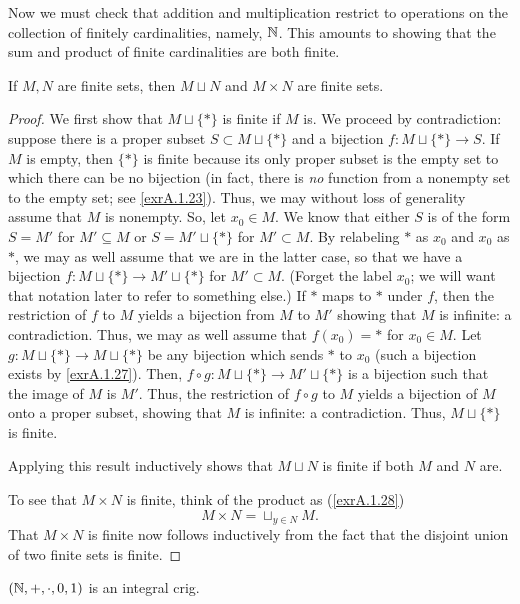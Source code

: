 Now we must check that addition and multiplication restrict to operations on the collection of finitely cardinalities, namely, $\mathbb{N}$.  This amounts to showing that the sum and product of finite cardinalities are both finite.
\begin{prp}
If $M,N$ are finite sets, then $M\sqcup N$ and $M\times N$ are finite sets.
\begin{proof}
We first show that $M\sqcup \{ \ast \}$ is finite if $M$ is.  We proceed by contradiction:  suppose there is a proper subset $S\subset M\sqcup \{ \ast \}$ and a bijection $f:M\sqcup \{ \ast \} \rightarrow S$.  If $M$ is empty, then $\{ \ast \}$ is finite because its only proper subset is the empty set to which there can be no bijection (in fact, there is \emph{no} function from a nonempty set to the empty set; see \cref{exrA.1.23}).  Thus, we may without loss of generality assume that $M$ is nonempty.  So, let $x_0\in M$.  We know that either $S$ is of the form $S=M'$ for $M'\subseteq M$ or $S=M'\sqcup \{ \ast \}$ for $M'\subset M$.  By relabeling $\ast$ as $x_0$ and $x_0$ as $\ast$, we may as well assume that we are in the latter case, so that we have a bijection $f:M\sqcup \{ \ast \} \rightarrow M'\sqcup \{ \ast \}$ for $M'\subset M$.  (Forget the label $x_0$; we will want that notation later to refer to something else.)  If $\ast$ maps to $\ast$ under $f$, then the restriction of $f$ to $M$ yields a bijection from $M$ to $M'$ showing that $M$ is infinite:  a contradiction.  Thus, we may as well assume that $f(x_0 )=\ast$ for $x_0\in M$.  Let $g:M\sqcup \{ \ast \} \rightarrow M\sqcup \{ \ast \}$ be any bijection which sends $\ast$ to $x_0$ (such a bijection exists by \cref{exrA.1.27}).  Then, $f\circ g:M\sqcup \{ \ast \} \rightarrow M'\sqcup \{ \ast \}$ is a bijection such that the image of $M$ is $M'$.  Thus, the restriction of $f\circ g$ to $M$ yields a bijection of $M$ onto a proper subset, showing that $M$ is infinite:  a contradiction.  Thus, $M\sqcup \{ \ast \}$ is finite.

Applying this result inductively shows that $M\sqcup N$ is finite if both $M$ and $N$ are.

To see that $M\times N$ is finite, think of the product as (\cref{exrA.1.28})
\begin{equation}
M\times N=\sqcup _{y\in N}M.
\end{equation}
That $M\times N$ is finite now follows inductively from the fact that the disjoint union of two finite sets is finite.
\end{proof}
\end{prp}
\begin{crl}
$(\mathbb{N} ,+,\cdot ,0,1)$ is an integral crig.
\end{crl}

